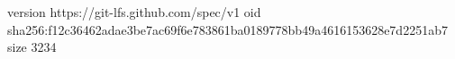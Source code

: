 version https://git-lfs.github.com/spec/v1
oid sha256:f12c36462adae3be7ac69f6e783861ba0189778bb49a4616153628e7d2251ab7
size 3234
